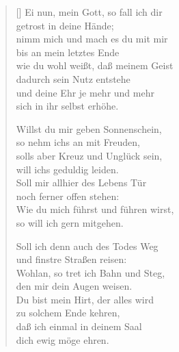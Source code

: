 \begin{multicols}{2}
\begin{verse}[\versewidth]
 Ei nun, mein Gott, so fall ich dir\\
getrost in deine Hände;\\
nimm mich und mach es du mit mir\\
bis an mein letztes Ende\\
wie du wohl weißt, daß meinem Geist\\
dadurch sein Nutz entstehe\\
und deine Ehr je mehr und mehr\\
sich in ihr selbst erhöhe.

 Willst du mir geben Sonnenschein,\\
so nehm ichs an mit Freuden,\\
solls aber Kreuz und Unglück sein,\\
will ichs geduldig leiden.\\
Soll mir allhier des Lebens Tür\\
noch ferner offen stehen:\\
Wie du mich führst und führen wirst,\\
so will ich gern mitgehen.

 Soll ich denn auch des Todes Weg\\
und finstre Straßen reisen:\\
Wohlan, so tret ich Bahn und Steg,\\
den mir dein Augen weisen.\\
Du bist mein Hirt, der alles wird\\
zu solchem Ende kehren,\\
daß ich einmal in deinem Saal\\
dich ewig möge ehren.

\end{verse}
\end{multicols}
